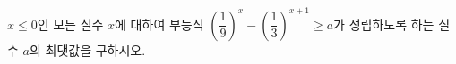 $x\le 0$인 모든 실수 $x$에 대하여 부등식 $\left(\dfrac{1}{9}\right)^{x}-\left(\dfrac{1}{3}\right)^{x+1}\ge a$가 성립하도록 하는 실수 $a$의 최댓값을 구하시오.
